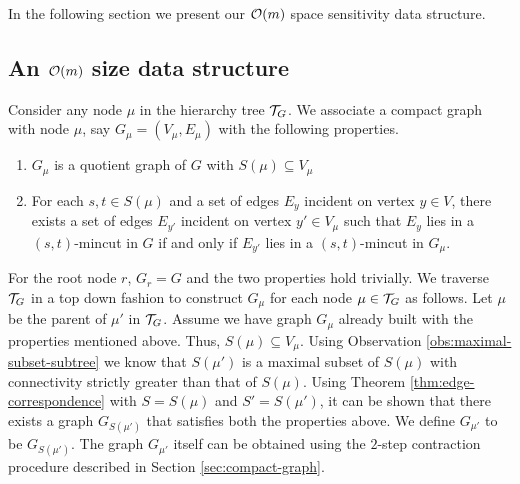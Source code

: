 
In the following section we present our ${\cal O}(m)$ space sensitivity data structure.


\subsection{\texorpdfstring{An ${\cal O}(m)$}{Linear} size data structure}

Consider any node $\mu$ in the hierarchy tree \cite{DBLP:journals/siamcomp/KatzKKP04} ${\cal T}_G$. We associate a compact graph with node $\mu$, say $G_\mu=(V_\mu,E_\mu)$ with the following properties. 

\begin{enumerate}
    \item $G_\mu$ is a quotient graph of $G$ with $S(\mu)\subseteq V_\mu$
    \item  For each $s,t\in S(\mu)$ and a set of edges $E_y$ incident on vertex $y\in V$, there exists a set of edges $E_{y'}$ incident on vertex $y'\in V_\mu$ such that $E_y$ lies in a $(s,t)$-mincut in $G$ if and only if $E_{y'}$ lies in a $(s,t)$-mincut in $G_\mu$.
\end{enumerate}

For the root node $r$, $G_r=G$ and the two properties hold trivially.
We traverse ${\cal T}_G$ in a top down fashion to construct $G_\mu$ for each node $\mu \in {\cal T}_G$ as follows. Let $\mu$ be the parent of $\mu'$ in ${\cal T}_G$. Assume we have graph $G_{\mu}$ already built with the properties mentioned above. Thus, $S(\mu)\subseteq V_\mu$. Using Observation \ref{obs:maximal-subset-subtree} we know that $S(\mu')$ is a maximal subset of $S(\mu)$ with connectivity strictly greater than that of $S(\mu)$. Using Theorem \ref{thm:edge-correspondence} with $S=S(\mu)$ and $S'=S(\mu')$, it can be shown that there exists a graph $G_{S(\mu')}$ 
that satisfies both the properties above. We define $G_{\mu'}$ to be $G_{S(\mu')}$.
The graph $G_{\mu'}$ itself
can be obtained using the $2$-step contraction procedure described in Section \ref{sec:compact-graph}.



